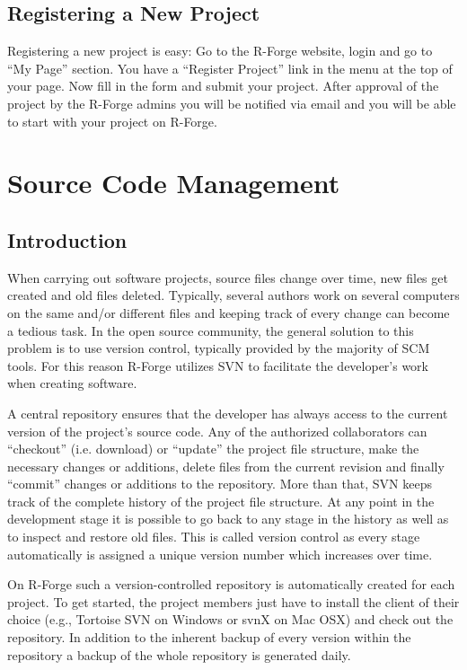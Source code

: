 \documentclass[a4paper]{article}
\newcommand{\proglang}[1]{\textsf{#1}}
\begin{document}
\subsection{Registering a New Project}
\label{sec:newproject}

Registering a new project is easy: Go to the \proglang{R}-Forge website, login and
go to ``My Page'' section. You have a ``Register Project'' link in the
menu at the top of your page. Now fill in the form and submit your
project. After approval of the project by the \proglang{R}-Forge admins  you will
be notified via email and you will be able to start with your project
on R-Forge.

\section{Source Code Management}
\label{sec:scm}

\subsection{Introduction}

When carrying out software projects, source files change over time,
new files get created and old files deleted. Typically, several authors
work on several computers on the same and/or different files and keeping
track of every change can become a tedious task. In the open source
community, the general solution to this problem is to use version
control, typically provided by the majority of SCM tools. For this
reason \proglang{R}-Forge utilizes SVN to facilitate the developer's
work when creating software.

A central repository ensures that the developer
has always access to the current version of the project's source
code. Any of the authorized collaborators can ``checkout''
(i.e. download) or ``update'' the project
file structure, make the necessary changes or additions, delete
files from the current revision and finally ``commit'' changes or
additions to the repository. More than
that, SVN keeps track of the complete history of the project file
structure. At any point in the development stage it is possible to go
back to any stage in the history as well as to inspect and restore old
files. This is called version control as every stage automatically is
assigned a unique version number which increases over time. 

On \proglang{R}-Forge such a version-controlled repository is automatically
created for each project. To get started, the project members just
have to install the client of their choice (e.g., Tortoise SVN on
Windows or svnX on 
Mac OSX) and check out the repository. In addition to the inherent
backup of every version within the repository a backup of the whole
repository is generated daily. 
\end{document}

